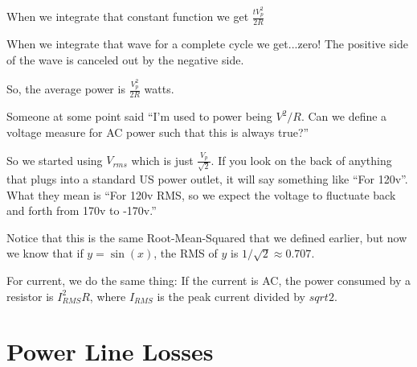     
When we integrate that constant function we get $\frac{t V_p^2}{2R}$

When we integrate that wave for a complete cycle we get...zero! The
positive side of the wave is canceled out by the negative side.

So, the average power is $\frac{V_p^2}{2R}$ watts.

Someone at some point said ``I'm used to power being $V^2/R$. Can
we define a voltage measure for AC power such that this is always true?''

So we started using $V_{rms}$ which is just
$\frac{V_p}{\sqrt{2}}$. If you look on the back of anything that plugs
into a standard US power outlet, it will say something like ``For
120v''.  What they mean is ``For 120v RMS, so we expect the voltage to
fluctuate back and forth from 170v to -170v.''

Notice that this is the same Root-Mean-Squared that we defined
earlier, but now we know that if $y = \sin(x)$, the RMS of $y$ is
$1/\sqrt{2} \approx 0.707$.

For current, we do the same thing: If the current is AC, the power
consumed by a resistor is $I_{RMS}^2 R$, where $I_{RMS}$ is the peak
current divided by $sqrt{2}$.

\section{Power Line Losses}

